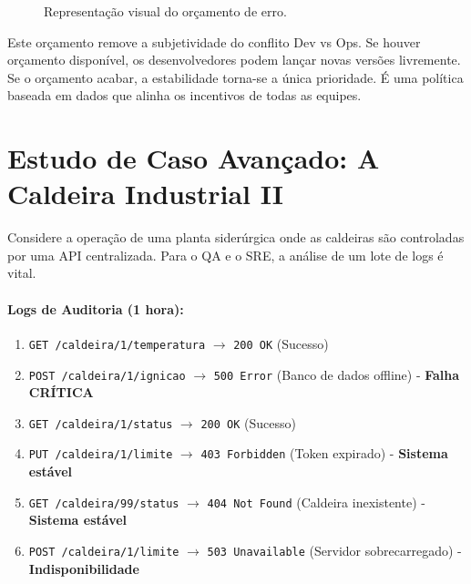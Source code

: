 \documentclass[12pt,a4paper]{report}
\begin{document}
\begin{figure}[h]
    \centering
    \caption{Representação visual do orçamento de erro.}
\end{figure}

Este orçamento remove a subjetividade do conflito Dev vs Ops. Se houver orçamento disponível, os desenvolvedores podem lançar novas versões livremente. Se o orçamento acabar, a estabilidade torna-se a única prioridade. É uma política baseada em dados que alinha os incentivos de todas as equipes.

\section{Estudo de Caso Avançado: A Caldeira Industrial II}

Considere a operação de uma planta siderúrgica onde as caldeiras são controladas por uma API centralizada. Para o QA e o SRE, a análise de um lote de logs é vital.

\paragraph{Logs de Auditoria (1 hora):}
\begin{enumerate}
    \item \texttt{GET /caldeira/1/temperatura} $\rightarrow$ \texttt{200 OK} (Sucesso)
    \item \texttt{POST /caldeira/1/ignicao} $\rightarrow$ \texttt{500 Error} (Banco de dados offline) - \textbf{Falha CRÍTICA}
    \item \texttt{GET /caldeira/1/status} $\rightarrow$ \texttt{200 OK} (Sucesso)
    \item \texttt{PUT /caldeira/1/limite} $\rightarrow$ \texttt{403 Forbidden} (Token expirado) - \textbf{Sistema estável}
    \item \texttt{GET /caldeira/99/status} $\rightarrow$ \texttt{404 Not Found} (Caldeira inexistente) - \textbf{Sistema estável}
    \item \texttt{POST /caldeira/1/limite} $\rightarrow$ \texttt{503 Unavailable} (Servidor sobrecarregado) - \textbf{Indisponibilidade}
\end{enumerate}
\end{document}
